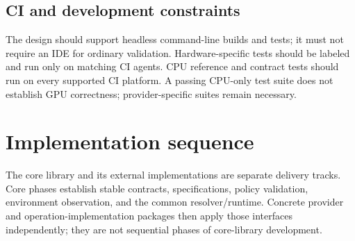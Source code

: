 \documentclass[11pt,a4paper,oneside]{article}
\begin{document}
\subsection{CI and development constraints}

The design should support headless command-line builds and tests; it must not require an IDE for ordinary validation. Hardware-specific tests should be labeled and run only on matching CI agents. CPU reference and contract tests should run on every supported CI platform. A passing CPU-only test suite does not establish GPU correctness; provider-specific suites remain necessary.

\section{Implementation sequence}

The core library and its external implementations are separate delivery tracks. Core phases establish stable contracts, specifications, policy validation, environment observation, and the common resolver/runtime. Concrete provider and operation-implementation packages then apply those interfaces independently; they are not sequential phases of core-library development.
\end{document}
